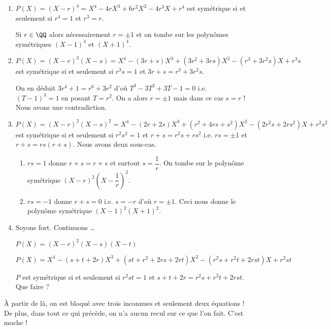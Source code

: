 \documentclass[12pt]{amsart}
\begin{document}
\begin{enumerate}
	\item $P(X) = (X - r)^4
	            = X^4
	            - 4 r X^3
	            + 6 r^2 X^2
	            - 4 r^3 X
	            + r^4$
	       est symétrique si et seulement si $r^4 = 1$ et $r^3 = r$.
	       
	       \noindent Si $r\in \QQ$ alors nécessairement $r = \pm 1$ et on tombe sur les polynômes symétriques $(X - 1)^4$ et $(X + 1)^4$.

	\item $P(X) = (X - r)^3 (X - s)
	            = X^4
	            - (3 r + s) X^3
	            + (3 r^2 + 3 r s) X^2
	            - (r^3 + 3 r^2 s) X
	            + r^3 s$
	       est symétrique si et seulement si $r^3 s = 1$ et $3 r + s = r^3 + 3 r^2 s$.
	       
	       \noindent On en déduit $3 r^4 + 1 = r^6 + 3 r^2$
	       d'où $T^3 - 3 T^2 + 3 T - 1 = 0$ i.e. $(T - 1)^3 = 1$
	       en posant $T = r^2$.
	       On a alors $r = \pm 1$ mais dans ce cas $s = r$ !
	       Nous avons une contradiction. 


	\item $P(X) = (X - r)^2 (X - s)^2
	            = X^4
	            - (2 r  + 2 s) X^3
	            + (r^2 + 4 r s + s^2) X^2
	            - (2 r^2 s + 2 r s^2) X
	            + r^2 s^2
	            $
	       est symétrique si et seulement si
	       $r^2 s^2 = 1$ et $r + s = r^2 s + r s^2$
	       i.e. $r s = \pm 1$ et $r + s = rs(r + s)$. Nous avons deux sous-cas.
		   \begin{enumerate}
			   \item $r s = 1$ donne $r  + s = r + s$ et surtout $s = \dfrac1r$.
			   On tombe sur le polynôme symétrique $(X - r)^2 \left( X - \dfrac1r \right)^2$.

			   \item $r s = -1$ donne $r  + s = 0$ i.e. $s = - r$ d'où $r = \pm 1$.
			   Ceci nous donne le polynôme symétrique $(X - 1)^2 ( X + 1)^2$.
		   \end{enumerate}
	
	\item Soyons fort. Continuons \dots
	
		  \noindent $P(X) = (X - r)^2 (X - s) (X - t)$
	
		  \noindent $P(X) = X^4
	            - (s + t + 2 r) X^3
	            + (s t + r^2 + 2 r s + 2 r t) X^2
	            - (r^2 s + r^2 t + 2 r s t) X 
	            + r^2 s t$
	       	
		  \noindent $P$ est symétrique si et seulement si
	       $r^2 s t = 1$ et $s + t + 2 r = r^2 s + r^2 t + 2 r s t$. Que faire ?
\end{enumerate}

À partir de là, on est bloqué avec trois inconnues et seulement deux équations ! De plus, dans tout ce qui précède, on n'a aucun recul sur ce que l'on fait. C'est moche !
\end{document}
